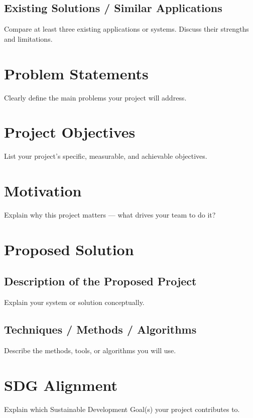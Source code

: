 \documentclass[12pt,a4paper]{article}
\begin{document}
\subsection{Existing Solutions / Similar Applications}
Compare at least three existing applications or systems. Discuss their strengths and limitations.

\section{Problem Statements}
Clearly define the main problems your project will address.

\section{Project Objectives}
List your project’s specific, measurable, and achievable objectives.

\section{Motivation}
Explain why this project matters — what drives your team to do it?

\section{Proposed Solution}
\subsection{Description of the Proposed Project}
Explain your system or solution conceptually.

\subsection{Techniques / Methods / Algorithms}
Describe the methods, tools, or algorithms you will use.

\section{SDG Alignment}
Explain which Sustainable Development Goal(s) your project contributes to.

\end{document}
